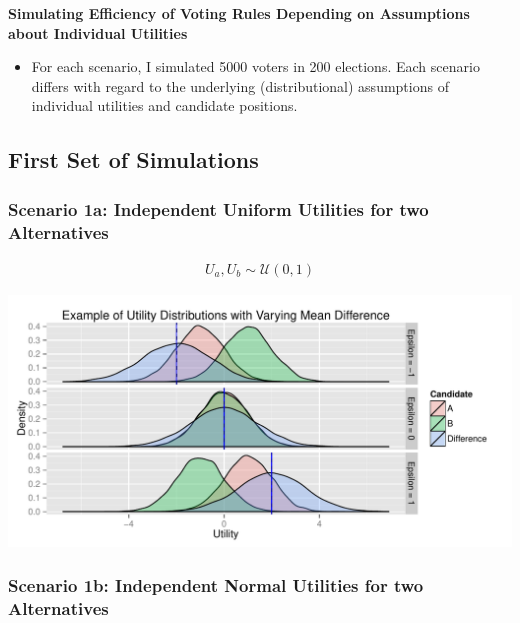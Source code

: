 \documentclass[12pt]{article}\usepackage[]{graphicx}\usepackage[]{color}
\makeatletter
\def\maxwidth{ %
  \ifdim\Gin@nat@width>\linewidth
    \linewidth
  \else
    \Gin@nat@width
  \fi
}
\newenvironment{knitrout}{}{} %
\makeatother
\begin{document}
\begin{center}
  {\Large \textbf{Simulating Efficiency of Voting Rules Depending on Assumptions about Individual Utilities}}
\end{center}

\begin{itemize}
\item For each scenario, I simulated 5000 voters in 200 elections. Each scenario differs with regard to the underlying (distributional) assumptions of individual utilities and candidate positions.
\end{itemize}




\subsection*{First Set of Simulations}
\subsubsection*{Scenario 1a: Independent Uniform Utilities for two Alternatives}

\begin{align*}
U_a,U_b \sim \mathcal{U}(0,1)
\end{align*}

\begin{knitrout}
\color{fgcolor}
\includegraphics[width=\maxwidth]{figure/unnamed-chunk-2} 

\end{knitrout}


\clearpage
\subsubsection*{Scenario 1b: Independent Normal Utilities for two Alternatives}
\end{document}
